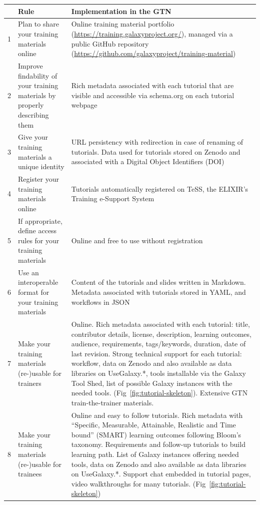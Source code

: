 \begin{table}[h!t]
    \footnotesize
	\centering
	\begin{tabular}{|l|p{}|p{}|}
	    \hline
		   & \textbf{Rule}                                                              & \textbf{Implementation in the GTN}\\\hline
		1  & {\raggedright Plan to share your training materials online}                               & Online training material portfolio (\url{https://training.galaxyproject.org/}), managed via a public GitHub repository (\url{https://github.com/galaxyproject/training-material})\\
		2  & {\raggedright Improve findability of your training materials by properly describing them} & Rich metadata associated with each tutorial that are visible and accessible via schema.org on each tutorial webpage\\
		3  & {\raggedright Give your training materials a unique identity}                             & URL persistency with redirection in case of renaming of tutorials. Data used for tutorials stored on Zenodo and associated with a Digital Object Identifiers (DOI) \\
		4  & {\raggedright Register your training materials online}                                    & Tutorials automatically registered on TeSS, the ELIXIR's Training e-Support System \cite{tess}  \\
		5  & {\raggedright If appropriate, define access rules for your training materials}            & Online and free to use without registration \\
		6  & {\raggedright Use an interoperable format for your training materials}                    & Content of the tutorials and slides written in Markdown. Metadata associated with tutorials stored in YAML, and workflows in JSON\\
		7  & {\raggedright Make your training materials (re-)usable for trainers}                      & Online. Rich metadata associated with each tutorial: title, contributor details, license, description, learning outcomes, audience, requirements, tags/keywords, duration, date of last revision. Strong technical support for each tutorial: workflow, data on Zenodo and also available as data libraries on UseGalaxy.*, tools installable via the Galaxy Tool Shed, list of possible Galaxy instances with the needed tools. (Fig~\ref{fig:tutorial-skeleton}). Extensive GTN train-the-trainer materials.\\
		8  & {\raggedright Make your training materials (re-)usable for trainees}                      & Online and easy to follow tutorials. Rich metadata with ``Specific, Measurable, Attainable, Realistic and Time bound'' (SMART) learning outcomes following Bloom's taxonomy. Requirements and follow-up tutorials to build learning path. List of Galaxy instances offering needed tools, data on Zenodo and also available as data libraries on UseGalaxy.*. Support chat embedded in tutorial pages, video walkthroughs for many tutorials. (Fig~\ref{fig:tutorial-skeleton})\\

\end{tabular}
\end{table}

